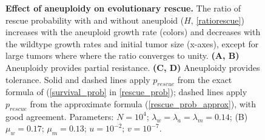 \documentclass[12pt]{extarticle}
\begin{document}
\begin{figure}
\begin{subfigure}{0.5\textwidth}
\end{subfigure}
\caption{\textbf{Effect of aneuploidy on evolutionary rescue.}
The ratio of rescue probability with and without aneuploid ($H$, \cref{ratiorescue}) increases with the aneuploid growth rate (colors) and decreases with the wildtype growth rates and initial tumor size (x-axes), except for large tumors where where the ratio converges to unity.
\textbf{(A, B)} Aneuploidy provides partial resistance.
\textbf{(C, D)} Aneuploidy provides tolerance.  
Solid and dashed lines apply $p_{rescue}$ from the exact formula of  (\cref{survival_prob} in \cref{rescue_prob}); dashed lines apply $p_{rescue}$ from the approximate formula (\cref{rescue_prob_approx}), with good agreement.
Parameters: $N=10^4$; $\lambda_w=\lambda_a=\lambda_m=0.14$; (B) $\mu_w=0.17$; $\mu_m=0.13$; $u=10^{-2}$; $v=10^{-7}$.
}
\label{rescue_ratio}
\end{figure}

\end{document}
